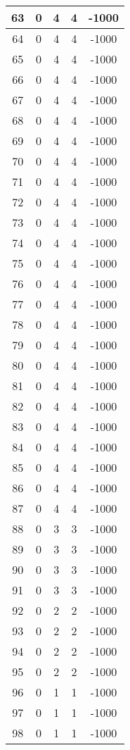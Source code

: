 \documentclass[letterpaper, 12pt]{article}
\begin{document}
\begin{longtable}{|c|c|c|c|c|}
\hline
63 & 0 & 4 & 4 & -1000 \\
\hline
64 & 0 & 4 & 4 & -1000 \\
\hline
65 & 0 & 4 & 4 & -1000 \\
\hline
66 & 0 & 4 & 4 & -1000 \\
\hline
67 & 0 & 4 & 4 & -1000 \\
\hline
68 & 0 & 4 & 4 & -1000 \\
\hline
69 & 0 & 4 & 4 & -1000 \\
\hline
70 & 0 & 4 & 4 & -1000 \\
\hline
71 & 0 & 4 & 4 & -1000 \\
\hline
72 & 0 & 4 & 4 & -1000 \\
\hline
73 & 0 & 4 & 4 & -1000 \\
\hline
74 & 0 & 4 & 4 & -1000 \\
\hline
75 & 0 & 4 & 4 & -1000 \\
\hline
76 & 0 & 4 & 4 & -1000 \\
\hline
77 & 0 & 4 & 4 & -1000 \\
\hline
78 & 0 & 4 & 4 & -1000 \\
\hline
79 & 0 & 4 & 4 & -1000 \\
\hline
80 & 0 & 4 & 4 & -1000 \\
\hline
81 & 0 & 4 & 4 & -1000 \\
\hline
82 & 0 & 4 & 4 & -1000 \\
\hline
83 & 0 & 4 & 4 & -1000 \\
\hline
84 & 0 & 4 & 4 & -1000 \\
\hline
85 & 0 & 4 & 4 & -1000 \\
\hline
86 & 0 & 4 & 4 & -1000 \\
\hline
87 & 0 & 4 & 4 & -1000 \\
\hline
88 & 0 & 3 & 3 & -1000 \\
\hline
89 & 0 & 3 & 3 & -1000 \\
\hline
90 & 0 & 3 & 3 & -1000 \\
\hline
91 & 0 & 3 & 3 & -1000 \\
\hline
92 & 0 & 2 & 2 & -1000 \\
\hline
93 & 0 & 2 & 2 & -1000 \\
\hline
94 & 0 & 2 & 2 & -1000 \\
\hline
95 & 0 & 2 & 2 & -1000 \\
\hline
96 & 0 & 1 & 1 & -1000 \\
\hline
97 & 0 & 1 & 1 & -1000 \\
\hline
98 & 0 & 1 & 1 & -1000 \\

\end{longtable}
\end{document}
